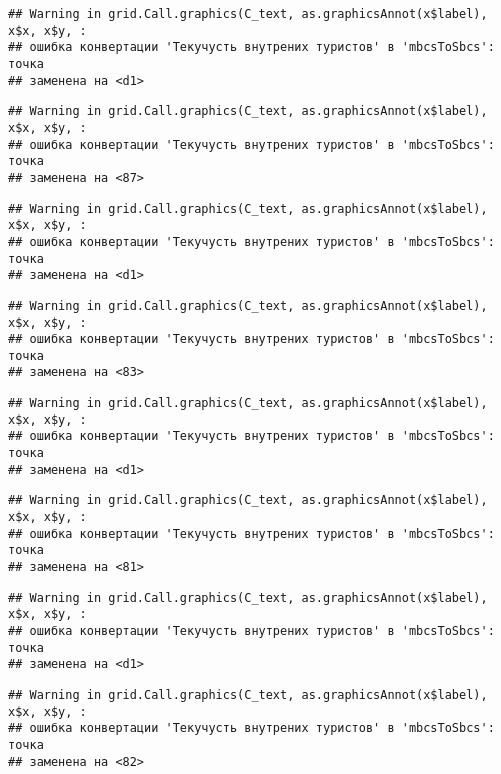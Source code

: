 \documentclass[
]{article}
\begin{document}
\begin{verbatim}
## Warning in grid.Call.graphics(C_text, as.graphicsAnnot(x$label), x$x, x$y, :
## ошибка конвертации 'Текучусть внутрених туристов' в 'mbcsToSbcs': точка
## заменена на <d1>
\end{verbatim}

\begin{verbatim}
## Warning in grid.Call.graphics(C_text, as.graphicsAnnot(x$label), x$x, x$y, :
## ошибка конвертации 'Текучусть внутрених туристов' в 'mbcsToSbcs': точка
## заменена на <87>
\end{verbatim}

\begin{verbatim}
## Warning in grid.Call.graphics(C_text, as.graphicsAnnot(x$label), x$x, x$y, :
## ошибка конвертации 'Текучусть внутрених туристов' в 'mbcsToSbcs': точка
## заменена на <d1>
\end{verbatim}

\begin{verbatim}
## Warning in grid.Call.graphics(C_text, as.graphicsAnnot(x$label), x$x, x$y, :
## ошибка конвертации 'Текучусть внутрених туристов' в 'mbcsToSbcs': точка
## заменена на <83>
\end{verbatim}

\begin{verbatim}
## Warning in grid.Call.graphics(C_text, as.graphicsAnnot(x$label), x$x, x$y, :
## ошибка конвертации 'Текучусть внутрених туристов' в 'mbcsToSbcs': точка
## заменена на <d1>
\end{verbatim}

\begin{verbatim}
## Warning in grid.Call.graphics(C_text, as.graphicsAnnot(x$label), x$x, x$y, :
## ошибка конвертации 'Текучусть внутрених туристов' в 'mbcsToSbcs': точка
## заменена на <81>
\end{verbatim}

\begin{verbatim}
## Warning in grid.Call.graphics(C_text, as.graphicsAnnot(x$label), x$x, x$y, :
## ошибка конвертации 'Текучусть внутрених туристов' в 'mbcsToSbcs': точка
## заменена на <d1>
\end{verbatim}

\begin{verbatim}
## Warning in grid.Call.graphics(C_text, as.graphicsAnnot(x$label), x$x, x$y, :
## ошибка конвертации 'Текучусть внутрених туристов' в 'mbcsToSbcs': точка
## заменена на <82>
\end{verbatim}
\end{document}
